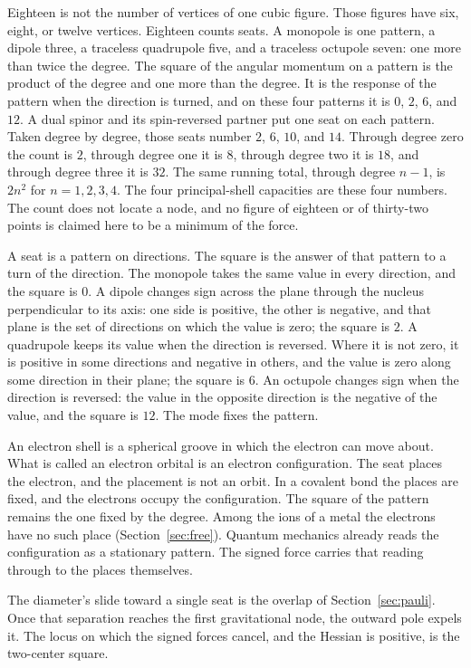 \documentclass[a4paper]{article}
\begin{document}
Eighteen is not the number of vertices of one cubic figure. Those figures have six, eight, or twelve vertices. Eighteen counts seats. A monopole is one pattern, a dipole three, a traceless quadrupole five, and a traceless octupole seven: one more than twice the degree. The square of the angular momentum on a pattern is the product of the degree and one more than the degree. It is the response of the pattern when the direction is turned, and on these four patterns it is \(0\), \(2\), \(6\), and \(12\). A dual spinor and its spin-reversed partner put one seat on each pattern. Taken degree by degree, those seats number \(2\), \(6\), \(10\), and \(14\). Through degree zero the count is \(2\), through degree one it is \(8\), through degree two it is \(18\), and through degree three it is \(32\). The same running total, through degree \(n-1\), is \(2n^{2}\) for \(n=1,2,3,4\). The four principal-shell capacities are these four numbers. The count does not locate a node, and no figure of eighteen or of thirty-two points is claimed here to be a minimum of the force.

A seat is a pattern on directions. The square is the answer of that pattern to a turn of the direction. The monopole takes the same value in every direction, and the square is \(0\). A dipole changes sign across the plane through the nucleus perpendicular to its axis: one side is positive, the other is negative, and that plane is the set of directions on which the value is zero; the square is \(2\). A quadrupole keeps its value when the direction is reversed. Where it is not zero, it is positive in some directions and negative in others, and the value is zero along some direction in their plane; the square is \(6\). An octupole changes sign when the direction is reversed: the value in the opposite direction is the negative of the value, and the square is \(12\). The mode fixes the pattern.

An electron shell is a spherical groove in which the electron can move about. What is called an electron orbital is an electron configuration. The seat places the electron, and the placement is not an orbit. In a covalent bond the places are fixed, and the electrons occupy the configuration. The square of the pattern remains the one fixed by the degree. Among the ions of a metal the electrons have no such place (Section~\ref{sec:free}). Quantum mechanics already reads the configuration as a stationary pattern. The signed force carries that reading through to the places themselves.

The diameter's slide toward a single seat is the overlap of Section~\ref{sec:pauli}. Once that separation reaches the first gravitational node, the outward pole expels it. The locus on which the signed forces cancel, and the Hessian is positive, is the two-center square.
\end{document}
